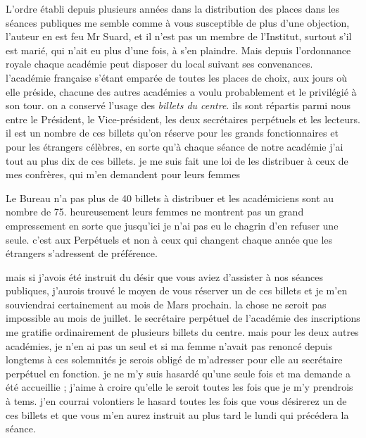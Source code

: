 \documentclass[11pt,a4paper]{article}
\begin{document}

L'ordre établi depuis plusieurs années dans la distribution des places dans
les séances publiques me semble comme à vous susceptible de plus d'une
objection, l'auteur en est feu Mr Suard, et il n'est pas un membre de
l'Institut, surtout s'il est marié, qui n'ait eu plus d'une fois, à s'en
plaindre. Mais depuis l'ordonnance royale chaque académie peut disposer du
local suivant ses convenances. l'académie française s'étant emparée de toutes
les places de choix, aux jours où elle préside, chacune des autres académies
a voulu probablement et le privilégié à son tour. on a conservé l'usage des
\emph{billets du centre}. ils sont répartis parmi nous entre le Président, le
Vice-président, les deux secrétaires perpétuels et les lecteurs. il est un
nombre de ces billets qu'on réserve pour les grands fonctionnaires et pour
les étrangers célèbres, en sorte qu'à chaque séance de notre académie j'ai
tout au plus dix de ces billets. je me suis fait une loi de les distribuer à
ceux de mes confrères, qui m'en demandent pour leurs femmes

Le Bureau n'a pas plus de 40 billets à distribuer et les académiciens sont au
nombre de 75. heureusement leurs femmes ne montrent pas un grand
empressement en sorte que jusqu'ici je n'ai pas eu le chagrin d'en refuser
une seule. c'est aux Perpétuels et non à ceux qui changent chaque année que
les étrangers s'adressent de préférence.


mais si j'avois été instruit du désir que vous aviez d'assister à nos séances
publiques, j'aurois trouvé le moyen de vous réserver un de ces billets et je
m'en souviendrai certainement au mois de Mars prochain. la chose ne seroit
pas impossible au mois de juillet. le secrétaire perpétuel de l'académie des
inscriptions me gratifie ordinairement de plusieurs billets du centre. mais
pour les deux autres académies, je n'en ai pas un seul et si ma femme n'avait
pas renoncé depuis longtems à ces solemnités je serois obligé de m'adresser
pour elle au secrétaire perpétuel en fonction. je ne m'y suis hasardé qu'une
seule fois et ma demande a été accueillie ; j'aime à croire qu'elle le seroit
toutes les fois que je m'y prendrois à tems. j'en courrai volontiers le
hasard toutes les fois que vous désirerez un de ces billets et que vous m'en
aurez instruit au plus tard le lundi qui précédera la séance.
\end{document}
